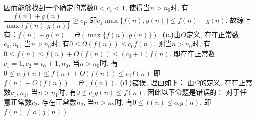 \documentclass[UTF8]{ctexart}
\begin{document}
\begin{solution}
		因而能够找到一个确定的常数$0 < c_1 < 1$, 使得当$n > n_0$时, 有$\dfrac{f(n) + g(n)}{\max\{f(n), g(n)\}} \geq c_1$.\newline
		即$c_1\max\{f(n), g(n)\} \leq f(n) + g(n)$.\newline
		故综上有：$f(n) + g(n) = \Theta(\max\{f(n), g(n)\})$.\newline
		\textbf{(c.)}由$O$定义, 存在正常数$c_0, n_0$, 当$n > n_0$时, 有$0 \leq O(f(n)) \leq c_0f(n)$.\newline
		则当$n > n_0$时, 有$0 \leq f(n) \leq f(n) + O(f(n)) \leq (c_0 + 1)f(n)$.\newline
		即存在正常数$c_1 = 1, c_2 = c_0 + 1, n_0$, 当$n > n_0$时, 有$0 \leq c_1f(n) \leq f(n) + O(f(n)) \leq c_2f(n)$\newline
		即$f(n) + O(f(n)) = \Theta(f(n))$.\newline
		\textbf{(d.)}错误, 理由如下：\newline
		由$\Omega$的定义, 存在正常数$c_1, n_1$, 当$n > n_1$时, 有$0 \leq c_1g(n) \leq f(n)$. 因此以下命题是错误的：\newline
		对于任意正常数$c_2$, 存在正常数$n_2$, 当$n > n_2$时, 有$0 \leq f(n) \leq c_2g(n)$. 即$f(n) \neq o(g(n))$.
	\end{solution}
\end{document}
